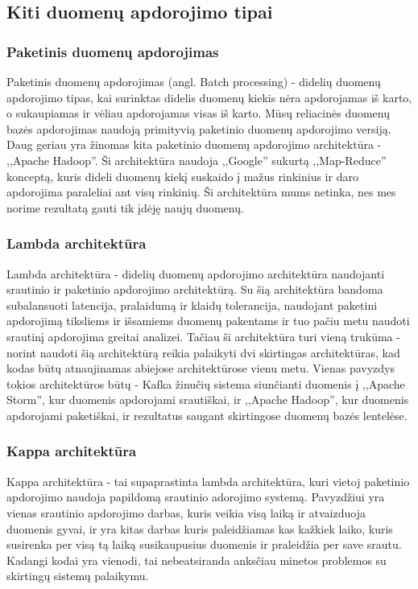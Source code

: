 \documentclass{VUMIFPSkursinis}
\begin{document}
\subsection{Kiti duomenų apdorojimo tipai}

\subsubsection{Paketinis duomenų apdorojimas}

Paketinis duomenų apdorojimas (angl. Batch processing) - didelių duomenų apdorojimo tipas, kai surinktas didelis duomenų kiekis nėra apdorojamas iš karto, o sukaupiamas ir vėliau apdorojamas visas iš karto. 
Mūsų reliacinės duomenų bazės apdorojimas naudoją primityvią paketinio duomenų apdorojimo versiją. Daug geriau yra žinomas kita paketinio duomenų apdorojimo architektūra - ,,Apache Hadoop''. Ši architektūra
naudoja ,,Google'' sukurtą ,,Map-Reduce'' konceptą\cite{dean2008mapreduce}, kuris dideli duomenų kiekį suskaido į mažus rinkinius ir daro apdorojima paraleliai ant visų rinkinių.\cite{batchProcessing} Ši architektūra mums netinka, nes mes norime rezultatą 
gauti tik įdėję naujų duomenų.

\subsubsection{Lambda architektūra}

Lambda architektūra - didelių duomenų apdorojimo architektūra naudojanti srautinio ir paketinio apdorojimo architektūrą. Su šią architektūra bandoma subalansuoti latencija, pralaidumą ir klaidų tolerancija, naudojant 
paketini apdorojimą tiksliems ir išsamiems duomenų pakentams ir tuo pačiu metu naudoti srautinį apdorojima greitai analizei\cite{hasani2014lambda}. Tačiau ši architektūra turi vieną trukūma - norint naudoti šią architektūrą
reikia palaikyti dvi skirtingas architektūras, kad kodas būtų atnaujinamas abiejose architektūrose vienu metu\cite{kreps2014questioning}. Vienas pavyzdys tokios architektūros būtų - Kafka žinučių sistema siunčianti duomenis į ,,Apache Storm'', 
kur duomenis apdorojami srautiškai, ir ,,Apache Hadoop'', kur duomenis apdorojami paketiškai, ir rezultatus saugant skirtingose duomenų bazės lentelėse.

\subsubsection{Kappa architektūra}

Kappa architektūra - tai supaprastinta lambda architektūra, kuri vietoj paketinio apdorojimo naudoja papildomą srautinio adorojimo systemą. Pavyzdžiui yra vienas srautinio apdorojimo darbas, kuris veikia visą laiką
ir atvaizduoja duomenis gyvai, ir yra kitas darbas kuris paleidžiamas kas kažkiek laiko, kuris susirenka per visą tą laiką susikaupusius duomenis ir praleidžia per save srautu. Kadangi kodai yra vienodi, tai nebeatsiranda 
anksčiau minetos problemos su skirtingų sistemų palaikymu\cite{kreps2014questioning, kappa}.
\end{document}
